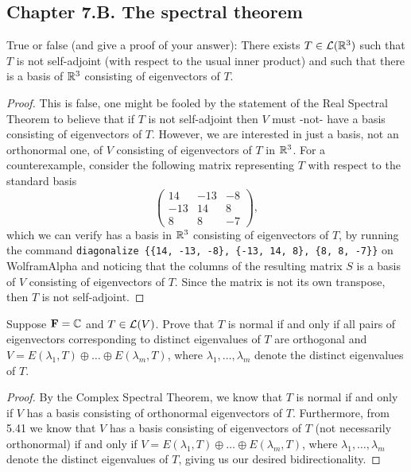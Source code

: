 \subsection*{Chapter 7.B. The spectral theorem}


\begin{exercise}{1}
  True or false (and give a proof of your answer): There exists $T\in\mathcal{L}(\mathbb{R}^3)$ such that $T$ is not self-adjoint (with respect to the usual inner product) and such that there is a basis of $\mathbb{R}^3$ consisting of eigenvectors of $T$.
\end{exercise}
\begin{proof}
 This is false, one might be fooled by the statement of the Real Spectral Theorem to believe that if $T$ is not self-adjoint then $V$ must -not- have a basis consisting of eigenvectors of $T$. However, we are interested in just a basis, not an orthonormal one, of $V$ consisting of eigenvectors of $T$ in $\mathbb{R}^3$. For a counterexample, consider the following matrix representing $T$ with respect to the standard basis
 \[
 \begin{pmatrix}
     14& -13& -8\\
     -13& 14& 8\\
     8& 8& -7
 \end{pmatrix},
 \]
 which we can verify has a basis in $\mathbb{R}^3$ consisting of eigenvectors of $T$, by running the command \verb|diagonalize {{14, -13, -8}, {-13, 14, 8}, {8, 8, -7}}| on WolframAlpha and noticing that the columns of the resulting matrix $S$ is a basis of $V$ consisting of eigenvectors of $T$. Since the matrix is not its own transpose, then $T$ is not self-adjoint.
\end{proof}

\begin{exercise}{4}
  Suppose $\mathbf{F}=\mathbb{C}$ and $T\in\mathcal{L}(V)$. Prove that $T$ is normal if and only if all pairs of eigenvectors corresponding to distinct eigenvalues of $T$ are orthogonal and $V =E(\lambda_1,T)\oplus\dots\oplus E(\lambda_m,T)$, where $\lambda_1,\dots,\lambda_m$ denote the distinct eigenvalues of $T$.
\end{exercise}
\begin{proof}
 By the Complex Spectral Theorem, we know that $T$ is normal if and only if $V$ has a basis consisting of orthonormal eigenvectors of $T$. Furthermore, from 5.41 we know that $V$ has a basis consisting of eigenvectors of $T$ (not necessarily orthonormal) if and only if $V =E(\lambda_1,T)\oplus\dots\oplus E(\lambda_m,T)$, where $\lambda_1,\dots,\lambda_m$ denote the distinct eigenvalues of $T$, giving us our desired bidirectionality.
\end{proof}

